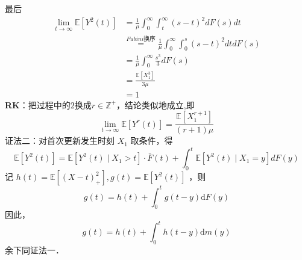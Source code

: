 \documentclass[UTF8]{ctexart}
\begin{document}
最后
\begin{align*}
	\lim _{t \rightarrow \infty} {\mathbb{E}}\left[Y^{2}(t)\right]&=\frac{1}{\mu}\int_{0}^{\infty} \int_{t}^{\infty} (s-t)^2dF(s)dt\\
	 & \stackrel{Fubini\text{换序}}{=}\frac{1}{\mu}\int_{0}^{\infty} \int_{0}^{s} (s-t)^2dtdF(s)\\
	 & =\frac{1}{\mu} \int_{0}^{\infty} \frac{s^3}{3}dF(s)\\
	 &=\frac{\mathbb{E}\left[X_1^3  \right]}{3\mu}\\
	 &=1
\end{align*}
\textbf{RK}：把过程中的$2$换成$r\in \mathbb{Z}^+$，结论类似地成立,即\\
$$
\lim _{t \rightarrow \infty} {\mathbb{E}}\left[Y^{r}(t)\right]=\frac{\mathbb{E}\left[X_1^{r+1} \right]}{(r+1)\mu}
$$
证法二：对首次更新发生时刻 $X_{1}$ 取条件，得
$$
\mathbb{E}\left[Y^{2}(t)\right]=\mathbb{E}\left[Y^{2}(t) \mid X_{1}>t\right] \cdot \bar{F}(t)+\int_{0}^{t} \mathbb{E}\left[Y^{2}(t) \mid X_{1}=y\right] d F(y)
$$
记 $h(t)=\mathbb{E}\left[(X-t)_{+}^{2}\right], g(t)=\mathbb{E}\left[Y^{2}(t)\right]$ ，则
$$
g(t)=h(t)+\int_{0}^{t} g(t-y) \mathrm{d} F(y)
$$
因此，
$$
g(t)=h(t)+\int_{0}^{t} h(t-y) \mathrm{d} m(y)
$$
余下同证法一．\\
\end{document}
